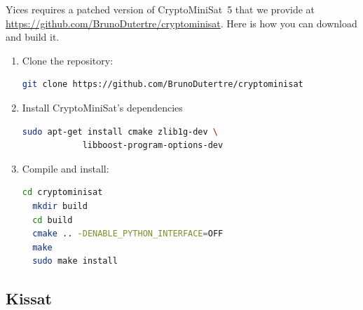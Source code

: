 \documentclass[11pt,twoside,fleqn,openright,titlepage]{cslreport}
\begin{document}
Yices requires a patched version of CryptoMiniSat~5 that we provide at
\url{https://github.com/BrunoDutertre/cryptominisat}. Here is how you can download and build it.
\begin{enumerate}
\item Clone the repository:
\begin{small}
\begin{lstlisting}[language=sh]
  git clone https://github.com/BrunoDutertre/cryptominisat
\end{lstlisting}
\end{small}
\item Install CryptoMiniSat's dependencies
\begin{small}
\begin{lstlisting}[language=sh]
  sudo apt-get install cmake zlib1g-dev \
            libboost-program-options-dev
\end{lstlisting}
\end{small}
\item Compile and install:
\begin{small}
\begin{lstlisting}[language=sh,deletekeywords={cd}]
  cd cryptominisat
  mkdir build
  cd build
  cmake .. -DENABLE_PYTHON_INTERFACE=OFF
  make
  sudo make install
\end{lstlisting}
\end{small}
\end{enumerate}

\subsection*{Kissat}
\end{document}
